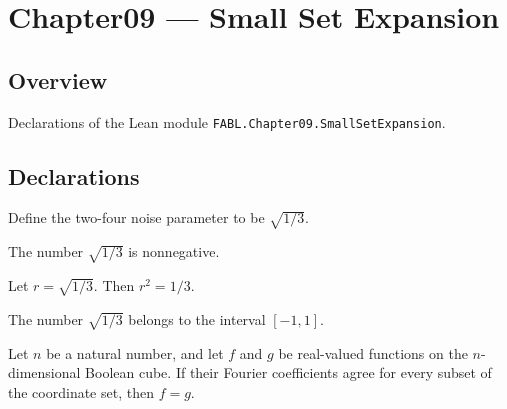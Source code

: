 \chapter{Chapter09 — Small Set Expansion}
\section{Overview}

Declarations of the Lean module \texttt{FABL.Chapter09.SmallSetExpansion}.

\section{Declarations}

\begin{definition}
\label{FABL.twoFourNoiseRoot}
\leanok
Define the two-four noise parameter to be $\sqrt{1/3}$.
\end{definition}

\begin{theorem}
\label{FABL.twoFourNoiseRoot_nonneg}
\leanok
{}
The number $\sqrt{1/3}$ is nonnegative.
\end{theorem}

\begin{theorem}
\label{FABL.twoFourNoiseRoot_sq}
\leanok
{}
Let $r = \sqrt{1/3}$. Then $r^2 = 1/3$.
\end{theorem}

\begin{theorem}
\label{FABL.twoFourNoiseRoot_mem_Icc}
\leanok
{}
The number $\sqrt{1/3}$ belongs to the interval $[-1,1]$.
\end{theorem}

\begin{theorem}
\label{FABL.smallSet_fourier_ext}
\leanok
{}
Let $n$ be a natural number, and let $f$ and $g$ be real-valued functions on the
$n$-dimensional Boolean cube. If their Fourier coefficients agree for every subset of
the coordinate set, then $f=g$.
\end{theorem}

